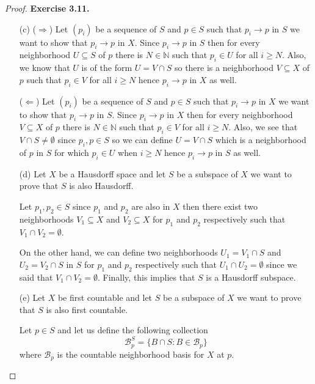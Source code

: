 \documentclass[11pt]{article}
\newcommand{\N}{\mathbb{N}}
\theoremstyle{definition}
\begin{document}
\begin{proof}{\textbf{Exercise 3.11.}}
    \begin{itemize}
        \item [(c)]
        ($\Rightarrow$) Let $(p_i)$ be a sequence of $S$ and $p \in S$ such
        that $p_i \to p$ in $S$ we want to show that $p_i \to p$ in $X$.
        Since $p_i \to p$ in $S$ then for every neighborhood $U \subseteq S$
        of $p$ there is $N \in \N$ such that $p_i \in U$ for all $i \geq N$.
        Also, we know that $U$ is of the form $U = V \cap S$
        so there is a neighborhood $V \subseteq X$ of $p$ such that $p_i \in V$
        for all $i \geq N$ hence $p_i \to p$ in $X$ as well.
        
        ($\Leftarrow$) Let $(p_i)$ be a sequence of $S$ and $p \in S$ such
        that $p_i \to p$ in $X$ we want to show that $p_i \to p$ in $S$.
        Since $p_i \to p$ in $X$ then for every neighborhood $V \subseteq X$
        of $p$ there is $N \in \N$ such that $p_i \in V$ for all $i \geq N$.
        Also, we see that $V \cap S \neq \emptyset$ since $p_i,p \in S$
        so we can define $U = V \cap S$ which is a neighborhood of $p$ in $S$
        for which $p_i \in U$ when $i \geq N$ hence $p_i \to p$ in $S$ as well.

        \item [(d)] Let $X$ be a Hausdorff space and let $S$ be a subspace of
        $X$ we want to prove that $S$ is also Hausdorff.

        Let $p_1, p_2 \in S$ since $p_1$ and $p_2$ are also in $X$ then there
        exist two neighborhoods $V_1 \subseteq X$ and $V_2 \subseteq X$
        for $p_1$ and $p_2$ respectively such that $V_1 \cap V_2 = \emptyset$.
        
        On the other hand, we can define two neighborhoods $U_1 = V_1 \cap S$
        and $U_2 = V_2 \cap S$ in $S$ for $p_1$ and $p_2$ respectively such
        that $U_1 \cap U_2 = \emptyset$ since we said that
        $V_1 \cap V_2 = \emptyset$.
        Finally, this implies that $S$ is a Hausdorff subspace.

        \item [(e)] Let $X$ be first countable and let $S$ be a subspace of
        $X$ we want to prove that $S$ is also first countable.

        Let $p \in S$ and let us define the following collection
        $$\mathcal{B}_p^S = \{ B \cap S : B \in \mathcal{B}_p\}$$
        where $\mathcal{B}_p$ is the countable neighborhood basis for $X$ at $p$.


\end{itemize}
\end{proof}
\end{document}
